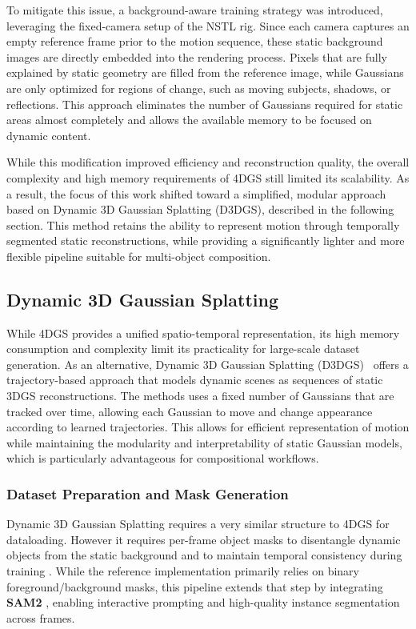 To mitigate this issue, a background-aware training strategy was introduced, leveraging the fixed-camera setup of the NSTL rig. 
Since each camera captures an empty reference frame prior to the motion sequence, these static background images are directly embedded into the rendering process. 
Pixels that are fully explained by static geometry are filled from the reference image, while Gaussians are only optimized for regions of change, such as moving subjects, shadows, or reflections. 
This approach eliminates the number of Gaussians required for static areas almost completely and allows the available memory to be focused on dynamic content.

While this modification improved efficiency and reconstruction quality, the overall complexity and high memory requirements of 4DGS still limited its scalability. 
As a result, the focus of this work shifted toward a simplified, modular approach based on Dynamic 3D Gaussian Splatting (D3DGS), described in the following section. 
This method retains the ability to represent motion through temporally segmented static reconstructions, while providing a significantly lighter and more flexible pipeline suitable for multi-object composition.


\subsection{Dynamic 3D Gaussian Splatting}
\label{sec:method_dynamic3d}

While 4DGS provides a unified spatio-temporal representation, its high memory consumption and complexity limit its practicality for large-scale dataset generation.
As an alternative, Dynamic 3D Gaussian Splatting (D3DGS)~\cite{luiten2024dynamic} offers a trajectory-based approach that models dynamic scenes as sequences of static 3DGS reconstructions.
The methods uses a fixed number of Gaussians that are tracked over time, allowing each Gaussian to move and change appearance according to learned trajectories.
This allows for efficient representation of motion while maintaining the modularity and interpretability of static Gaussian models, which is particularly advantageous for compositional workflows.

\subsubsection{Dataset Preparation and Mask Generation}

Dynamic 3D Gaussian Splatting requires a very similar structure to 4DGS for dataloading.
However it requires per-frame object masks to disentangle dynamic objects from the static background and to maintain temporal consistency during training \cite{luiten2024dynamic}. While the reference implementation primarily relies on binary foreground/background masks, this pipeline extends that step by integrating \textbf{SAM2} \cite{ravi2024sam2}, enabling interactive prompting and high-quality instance segmentation across frames.


